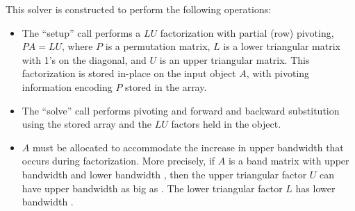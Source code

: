 This solver is constructed to perform the following operations:
\begin{itemize}
\item The ``setup'' call performs a $LU$ factorization with
  partial (row) pivoting, $PA=LU$, where $P$ is a permutation matrix,
  $L$ is a lower triangular matrix with 1's on the diagonal, and $U$
  is an upper triangular matrix.  This factorization is stored
  in-place on the input {\sunmatband} object $A$, with pivoting
  information encoding $P$ stored in the  array.
\item The ``solve'' call performs pivoting and forward and
  backward substitution using the stored  array and the
  $LU$ factors held in the {\sunmatband} object.
\item
  {\warn} $A$ must be allocated to accommodate the increase in upper
  bandwidth that occurs during factorization.  More precisely, if $A$
  is a band matrix with upper bandwidth  and lower bandwidth
  , then the upper triangular factor $U$ can have upper
  bandwidth as big as . The lower triangular
  factor $L$ has lower bandwidth .
\end{itemize}


